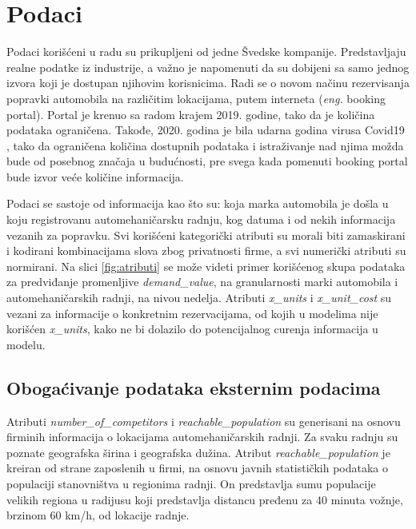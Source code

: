 \documentclass[12pt,oneside]{memoir}
\begin{document}
\section{Podaci}
Podaci korišćeni u radu su prikupljeni od jedne Švedske kompanije. Predstavljaju realne podatke iz industrije, a važno je napomenuti da su dobijeni sa samo jednog izvora koji je dostupan njihovim korisnicima. Radi se o novom načinu rezervisanja popravki automobila na različitim lokacijama, putem interneta (\textit{eng.} booking portal). Portal je krenuo sa radom krajem 2019. godine, tako da je količina podataka ograničena. Takođe, 2020. godina je bila udarna godina virusa Covid19 \cite{madabhavi2020covid}, tako da ograničena količina dostupnih podataka i istraživanje nad njima možda bude od posebnog značaja u budućnosti, pre svega kada pomenuti booking portal bude izvor veće količine informacija.

Podaci se sastoje od informacija kao što su: koja marka automobila je došla u koju registrovanu automehaničarsku radnju, kog datuma i od nekih informacija vezanih za popravku. Svi korišćeni kategorički atributi su morali biti zamaskirani i kodirani kombinacijama slova zbog privatnosti firme, a svi numerički atributi su normirani. Na slici \ref{fig:atributi} se može videti primer korišćenog skupa podataka za predviđanje promenljive \textit{demand\_value}, na granularnosti marki automobila i  automehaničarskih radnji, na nivou nedelja. Atributi \textit{x\_units} i \textit{x\_unit\_cost} su vezani za informacije o konkretnim rezervacijama, od kojih u modelima nije korišćen \textit{x\_units}, kako ne bi dolazilo do potencijalnog curenja informacija u modelu.

\subsection{Obogaćivanje podataka eksternim podacima}
Atributi \textit{number\_of\_competitors} i \textit{reachable\_population} su generisani na osnovu firminih informacija o lokacijama automehaničarskih radnji. Za svaku radnju su poznate geografska širina i geografska dužina. Atribut \textit{reachable\_population} je kreiran od strane zaposlenih u firmi, na osnovu javnih statističkih podataka o populaciji stanovništva u regionima radnji. On predstavlja sumu populacije velikih regiona u radijusu koji predstavlja distancu pređenu za 40 minuta vožnje, brzinom 60 km/h, od lokacije radnje. 
\end{document}
